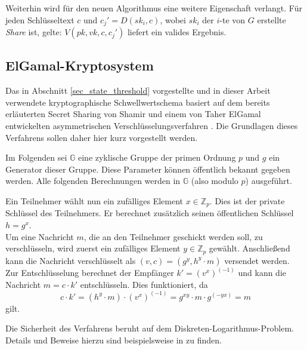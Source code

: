 Weiterhin wird für den neuen Algorithmus eine weitere Eigenschaft verlangt. Für jeden Schlüsseltext \(c\) und \(c_j' = D(sk_i,c)\), wobei \(sk_i\) der \(i\)-te von \(G\) erstellte \textit{Share} ist, gelte: \(V(pk, vk, c, c_j')\) liefert ein valides Ergebnis.

\subsection{ElGamal-Kryptosystem}

\label{sec_basics_threshold_elgamal}

Das in Abschnitt \ref{sec_state_threshold} vorgestellte und in dieser Arbeit verwendete kryptographische Schwellwertschema basiert auf dem bereits erläuterten Secret Sharing von Shamir und einem von Taher ElGamal entwickelten asymmetrischen Verschlüsselungsverfahren \cite{elgamal1985}. Die Grundlagen dieses Verfahrens sollen daher hier kurz vorgestellt werden.

Im Folgenden sei \(\mathbb{G}\) eine zyklische Gruppe der primen Ordnung \(p\) und \(g\) ein Generator dieser Gruppe. Diese Parameter können öffentlich bekannt gegeben werden. Alle folgenden Berechnungen werden in \(\mathbb{G}\) (also modulo \(p\)) ausgeführt.

Ein Teilnehmer wählt nun ein zufälliges Element \(x \in \mathbb{Z}_p\). Dies ist der private Schlüssel des Teilnehmers. Er berechnet zusätzlich seinen öffentlichen Schlüssel \(h = g^x\).\\
Um eine Nachricht \(m\), die an den Teilnehmer geschickt werden soll, zu verschlüsseln, wird zuerst ein zufälliges Element \(y \in \mathbb{Z}_p\) gewählt. Anschließend kann die Nachricht verschlüsselt als \((v, c) = (g^y, h^y \cdot m)\) versendet werden.\\
Zur Entschlüsselung berechnet der Empfänger \(k' = (v^x)^{(-1)}\) und kann die Nachricht \(m = c \cdot k'\) entschlüsseln. Dies funktioniert, da 
\[c \cdot k' = (h^y \cdot m) \cdot (v^x)^{(-1)} = g^{xy} \cdot m \cdot g^{(-yx)} = m\]
gilt.

Die Sicherheit des Verfahrens beruht auf dem Diskreten-Logarithmus-Problem. Details und Beweise hierzu sind beispielsweise in \cite{katz2014} zu finden. 
